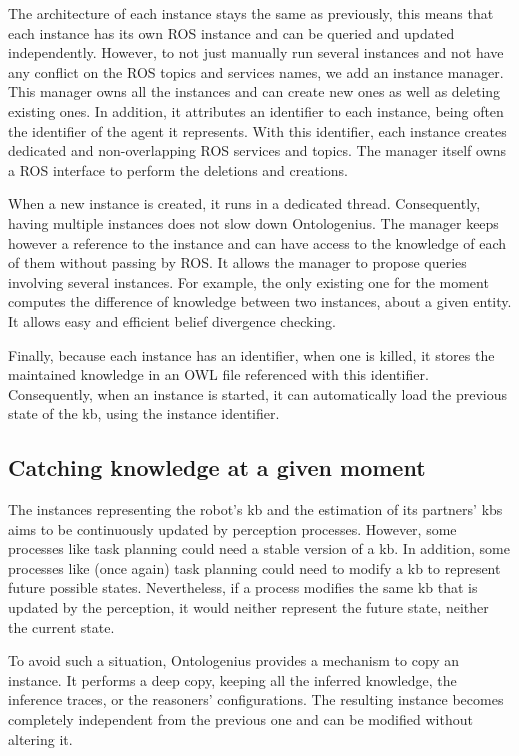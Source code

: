 The architecture of each instance stays the same as previously, this means that each instance has its own ROS instance and can be queried and updated independently. However, to not just manually run several instances and not have any conflict on the ROS topics and services names, we add an instance manager. This manager owns all the instances and can create new ones as well as deleting existing ones. In addition, it attributes an identifier to each instance, being often the identifier of the agent it represents. With this identifier, each instance creates dedicated and non-overlapping ROS services and topics. The manager itself owns a ROS interface to perform the deletions and creations.

When a new instance is created, it runs in a dedicated thread. Consequently, having multiple instances does not slow down Ontologenius. The manager keeps however a reference to the instance and can have access to the knowledge of each of them without passing by ROS. It allows the manager to propose queries involving several instances. For example, the only existing one for the moment computes the difference of knowledge between two instances, about a given entity. It allows easy and efficient belief divergence checking.

Finally, because each instance has an identifier, when one is killed, it stores the maintained knowledge in an OWL file referenced with this identifier. Consequently, when an instance is started, it can automatically load the previous state of the \acrshort{kb}, using the instance identifier.

\subsection{Catching knowledge at a given moment}

The instances representing the robot's \acrshort{kb} and the estimation of its partners' \acrshort{kb}s aims to be continuously updated by perception processes. However, some processes like task planning could need a stable version of a \acrshort{kb}. In addition, some processes like (once again) task planning could need to modify a \acrshort{kb} to represent future possible states. Nevertheless, if a process modifies the same \acrshort{kb} that is updated by the perception, it would neither represent the future state, neither the current state.

To avoid such a situation, Ontologenius provides a mechanism to copy an instance. It performs a deep copy, keeping all the inferred knowledge, the inference traces, or the reasoners' configurations. The resulting instance becomes completely independent from the previous one and can be modified without altering it.

